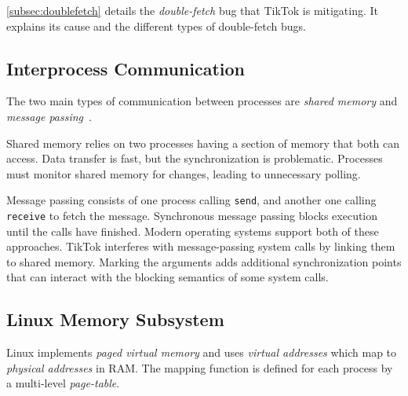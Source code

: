 \documentclass[conference]{IEEEtran}
\newcommand{\sysname}{TikTok}
\begin{document}
\autoref{subsec:doublefetch} details the \emph{double-fetch} bug that \sysname{}
is mitigating. It explains its cause and the different types of double-fetch bugs.


\subsection{Interprocess Communication}
\label{subsec:ipc}

The two main types of communication between processes are \emph{shared memory} 
and \emph{message passing}~\cite{silberschatz2018operating}.

Shared memory relies on two processes having a section of memory that both can 
access. Data transfer is fast, but the synchronization is problematic. 
Processes must monitor shared memory for changes, leading to unnecessary
polling.

Message passing consists of one process calling \texttt{send}, and another one
calling \texttt{receive} to fetch the message. Synchronous message passing
blocks execution until the calls have finished.
Modern operating systems support both of these approaches. \sysname{} interferes
with message-passing system calls by linking them to shared memory. Marking the
arguments adds additional synchronization points that can interact with the
blocking semantics of some system calls.

\subsection{Linux Memory Subsystem}
\label{subsec:vm}

Linux implements \emph{paged virtual memory} and uses \emph{virtual addresses}
which map to \emph{physical addresses} in RAM. The mapping function is defined
for each process by a multi-level \emph{page-table}.
\end{document}
